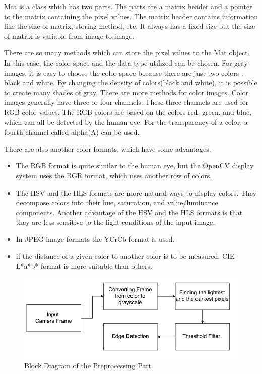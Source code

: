 Mat is a class which has two parts. The parts are a matrix header and a pointer to the matrix containing the pixel values. The matrix header contains information like the size of matrix, storing method, etc. It always has a fixed size but the size of matrix is variable from image to image.

There are so many methods which can store the pixel values to the Mat object. In this case, the color space and the data type utilized can be chosen. For gray images, it is easy to choose the color space because there are just two colors : black and white. By changing the density of colors(black and white), it is possible to create many shades of gray. There are more methods for color images. Color images generally have three or four channels. These three channels are used for RGB color values. The RGB colors are based on the colors red, green, and blue, which can all be detected by the human eye. For the transparency of a color, a fourth channel called alpha(A) can be used.

There are also another color formats, which have some advantages\cite{OpenCV_Mat}. 

\begin{itemize}

\item The RGB format is quite similar to the human eye, but the OpenCV display system uses the BGR format, which uses another row of colors.  

\item The HSV and the HLS formats are more natural ways to display colors. They decompose colors into their hue, saturation, and value/luminance components. Another advantage of the HSV and the HLS formats is that they are less sensitive to the light conditions of the input image.

\item In JPEG image formats the YCrCb format is used.

\item if the distance of a given color to another color is to be measured, CIE L*a*b* format is more suitable than others.

\end{itemize}




\begin{figure}[H]
 \centering
  \includegraphics[width=1\textwidth]{./Bilder/Presprocessing_Figure.png}	
  \caption{Block Diagram of the Preprocessing Part}
  \label{fig:Block_Diagram_of_the_Preprocessing_Part}
\end{figure}





